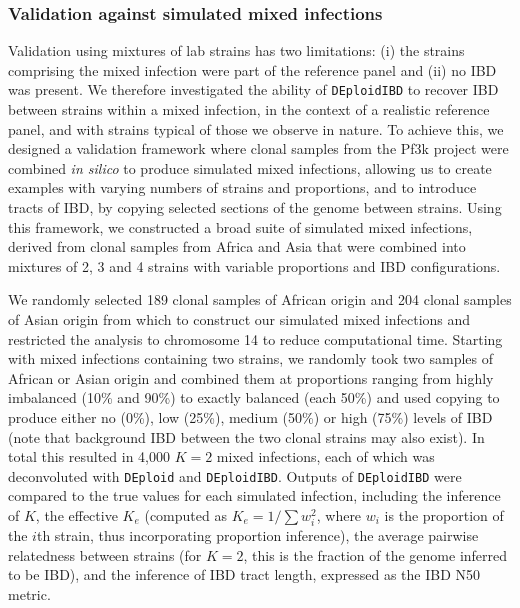 \documentclass[9pt,lineno]{elife}
\begin{document}
\subsubsection{Validation against simulated mixed infections}

Validation using mixtures of lab strains has two limitations: (i) the strains comprising the mixed infection were part of the reference panel and (ii) no IBD was present.  We therefore investigated the ability of \texttt{DEploidIBD} to recover IBD between strains within a mixed infection, in the context of a realistic reference panel, and with strains typical of those we observe in nature.  To achieve this, we designed a validation framework where clonal samples from the Pf3k project were combined {\it in silico } to produce simulated mixed infections, allowing us to create examples with varying numbers of strains and proportions, and to introduce tracts of IBD, by copying selected sections of the genome between strains. Using this framework, we constructed a broad suite of simulated mixed infections, derived from clonal samples from Africa and Asia that were combined into mixtures of 2, 3 and 4 strains with variable proportions and IBD configurations.

We randomly selected 189 clonal samples of African origin and 204 clonal samples of Asian origin from which to construct our simulated mixed infections and restricted the analysis to chromosome 14 to reduce computational time. Starting with mixed infections containing two strains, we randomly took two samples of African or Asian origin and combined them at proportions ranging from highly imbalanced (10\% and 90\%) to exactly balanced (each 50\%) and used copying to produce either no (0\%), low (25\%), medium (50\%) or high (75\%) levels of IBD (note that background IBD between the two clonal strains may also exist). In total this resulted in 4,000 $K=2$ mixed infections, each of which was deconvoluted with \texttt{DEploid} and \texttt{DEploidIBD}. Outputs of \texttt{DEploidIBD} were compared to the true values for each simulated infection, including the inference of $K$, the effective $K_e$ (computed as $K_e = 1/\sum w_{i}^{2}$, where $w_i$ is the proportion of the $i$th strain, thus incorporating proportion inference), the average pairwise relatedness between strains (for $K=2$, this is the fraction of the genome inferred to be IBD), and the inference of IBD tract length, expressed as the IBD N50 metric.
\end{document}
